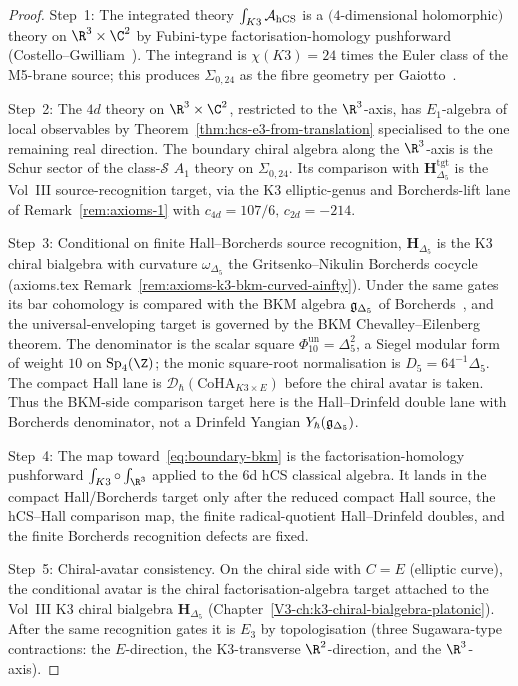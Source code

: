 \begin{proof}
Step~1: The integrated theory $\int_{K3}\mathcal{A}_{\mathrm{hCS}}$ is a
$(4$-dimensional holomorphic$)$ theory on $\R^3\times\C^2$ by
Fubini-type factorisation-homology pushforward
(Costello--Gwilliam~\cite[Ch.\,3,\,\S3.6]{CostelloGwilliam2017}). The
integrand is $\chi(K3) = 24$ times the Euler class of the M5-brane
source; this produces $\Sigma_{0,24}$ as the fibre geometry per
Gaiotto~\cite{Gaiotto2009}.

Step~2: The $4d$ theory on $\R^3\times\C^2$, restricted to the
$\R^3$-axis, has $E_1$-algebra of local observables by
Theorem~\ref{thm:hcs-e3-from-translation} specialised to the
one remaining real direction. The boundary chiral algebra along the
$\R^3$-axis is the Schur sector of the class-$\mathcal S$ $A_1$ theory
on $\Sigma_{0,24}$. Its comparison with
$\mathbf{H}_{\Delta_5}^{\mathrm{tgt}}$ is the Vol~III
source-recognition target, via the K3 elliptic-genus and
Borcherds-lift lane of
Remark~\ref{rem:axioms-1} with
$c_{4d} = 107/6,\,c_{2d} = -214$.

Step~3: Conditional on finite Hall--Borcherds source recognition,
$\mathbf H_{\Delta_5}$ is the K3 chiral bialgebra with curvature
$\omega_{\Delta_5}$ the Gritsenko--Nikulin Borcherds cocycle
(axioms.tex Remark~\ref{rem:axioms-k3-bkm-curved-ainfty}). Under the
same gates its bar cohomology is compared with the BKM algebra
$\mathfrak{g}_{\Delta_5}$ of Borcherds~\cite{Borcherds98}, and the
universal-enveloping target is governed by the BKM
Chevalley--Eilenberg theorem.
The denominator is the scalar square
$\Phi_{10}^{\mathrm{un}}=\Delta_5^2$, a Siegel modular form of
weight $10$ on $\mathrm{Sp}_4(\Z)$; the monic square-root
normalisation is $D_5=64^{-1}\Delta_5$.
The compact Hall lane is
$\mathcal D_\hbar(\mathrm{CoHA}_{K3\times E})$ before the chiral avatar is
taken. Thus the BKM-side comparison target here is the
Hall--Drinfeld double lane
with Borcherds denominator, not a Drinfeld Yangian
$Y_\hbar(\mathfrak{g}_{\Delta_5})$.

Step~4: The map toward~\eqref{eq:boundary-bkm} is the
factorisation-homology pushforward
$\int_{K3}\circ\int_{\R^3}$ applied to the 6d hCS classical algebra.
It lands in the compact Hall/Borcherds target only after the reduced
compact Hall source, the hCS--Hall comparison map, the finite
radical-quotient Hall--Drinfeld doubles, and the finite Borcherds
recognition defects are fixed.

Step~5: Chiral-avatar consistency. On the chiral side with
$C = E$ (elliptic curve), the conditional avatar is the chiral
factorisation-algebra target attached to the Vol~III K3 chiral
bialgebra $\mathbf H_{\Delta_5}$
(Chapter~\ref{V3-ch:k3-chiral-bialgebra-platonic}). After the same
recognition gates it is $E_3$ by topologisation (three Sugawara-type
contractions: the $E$-direction, the K3-transverse $\R^2$-direction,
and the $\R^3$-axis).
\end{proof}

